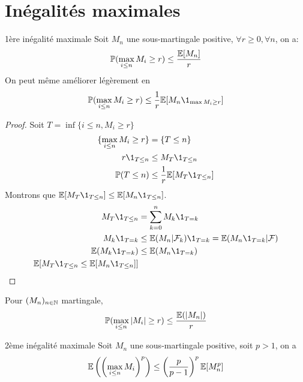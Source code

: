 \documentclass[]{report}
\begin{document}
    \section{Inégalités maximales}
    
    \begin{tm}{1ère inégalité maximale}{}
        Soit $M_n$ une sous-martingale positive, $\forall r\ge 0,\forall n$, on a:
        \[\mathbb{P}(\max_{i\le n}M_i\ge r)\le \frac{\mathbb{E}[M_n]}{r}\]
        On peut même améliorer légèrement en
        \[\Pa(\max_{i\le n}M_i\ge r)\le \frac{1}{r}\Ea[M_n \1_{\max M_i\ge r}]\]
    \end{tm}

    \begin{proof}
        Soit $T=\inf\{i\le n, M_i\ge r\}$
        \begin{align*}
            \{\max_{i\le n}M_i\ge r\}&=\{T\le n\}\\
            r\1_{T\le n}&\le M_T\1_{T\le n}\\
            \Pa(T\le n)&\le \frac{1}{r}\Ea[M_T\1_{T\le n}]
        \end{align*}
        Montrons que $\Ea[M_T\1_{T\le n}]\le \Ea[M_n\1_{T\le n}]$.
        \begin{align*}
            M_T \1_{T\le n}&=\sum_{k=0}^{n}M_k\1_{T=k}\\
            M_k\1_{T=k}&\le \Ea(M_n|\Fr_k)\1_{T=k}=\Ea(M_n\1_{T=k}|\Fr)\\
            \Ea(M_k\1_{T=k})&\le \Ea(M_n\1_{T=k})\\
            \Ea[M_T\1_{T\le n}\le \Ea[M_n\1_{T\le n}]]
        \end{align*}
    \end{proof}

    \begin{cor}{}{}
        Pour $(M_n)_{n\in\mathbb{N}}$ martingale,
        \[\mathbb{P}(\max_{i\le n}|M_i|\ge r)\le \frac{\mathbb{E}(|M_n|)}{r}\]
    \end{cor}

    \begin{tm}{2ème inégalité maximale}{}
        Soit $M_n$ une sous-martingale positive, soit $p>1$, on a
        \[\mathbb{E}\left(\left(\max_{i\le n}M_i \right)^p\right)\le \left(\frac{p}{p-1}\right)^p \mathbb{E}[M_n^p]\]
    \end{tm}
\end{document}
